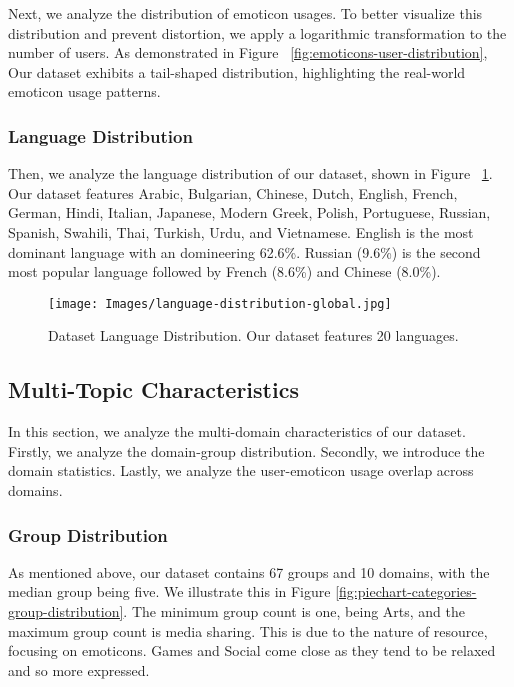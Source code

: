Next, we analyze the distribution of emoticon usages. To better visualize this distribution and prevent distortion, we apply a logarithmic transformation to the number of users. As demonstrated in Figure ~\ref{fig:emoticons-user-distribution}, Our dataset exhibits a tail-shaped distribution, highlighting the real-world emoticon usage patterns.

\subsubsection{Language Distribution}
Then, we analyze the language distribution of our dataset, shown in Figure ~\ref{fig:language-distribution-v2}. Our dataset features Arabic, Bulgarian, Chinese, Dutch, English, French, German, Hindi, Italian, Japanese, Modern Greek, Polish, Portuguese, Russian, Spanish, Swahili, Thai, Turkish, Urdu, and Vietnamese. English is the most dominant language with an domineering 62.6\%. Russian (9.6\%) is the second most popular language followed by French (8.6\%) and Chinese (8.0\%). 

\begin{figure}[htbp] 
    \centering \texttt{[image: Images/language-distribution-global.jpg]} 
    \caption{Dataset Language Distribution. Our dataset features 20 languages.} 
\label{fig:language-distribution-v2} 
\end{figure}

\subsection{Multi-Topic Characteristics}
In this section, we analyze the multi-domain characteristics of our dataset. Firstly, we analyze the domain-group distribution. Secondly, we introduce the domain statistics. Lastly, we analyze the user-emoticon usage overlap across domains.


\subsubsection{Group Distribution}
As mentioned above, our dataset contains 67 groups and 10 domains, with the median group being five. We illustrate this in Figure \ref{fig:piechart-categories-group-distribution}. The minimum group count is one, being Arts, and the maximum group count is media sharing. This is due to the nature of resource, focusing on emoticons. Games and Social come close as they tend to be relaxed and so more expressed.

